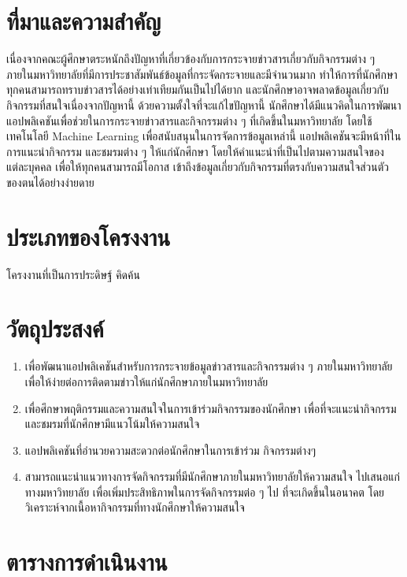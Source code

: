 \documentclass[14pt,oneside,openright,a4paper]{cpe-thai-project}
\begin{document}
\section{ที่มาและความสำคัญ}

เนื่องจากคณะผู้ศึกษาตระหนักถึงปัญหาที่เกี่ยวข้องกับการกระจายข่าวสารเกี่ยวกับกิจกรรมต่าง ๆ ภายในมหาวิทยาลัยที่มีการประชาสัมพันธ์ข้อมูลที่กระจัดกระจายและมีจำนวนมาก 
ทำให้การที่นักศึกษาทุกคนสามารถทราบข่าวสารได้อย่างเท่าเทียมกันเป็นไปได้ยาก และนักศึกษาอาจพลาดข้อมูลเกี่ยวกับกิจกรรมที่สนใจเนื่องจากปัญหานี้
ด้วยความตั้งใจที่จะแก้ไขปัญหานี้ นักศึกษาได้มีแนวคิดในการพัฒนา แอปพลิเคชันเพื่อช่วยในการกระจายข่าวสารและกิจกรรมต่าง ๆ ที่เกิดขึ้นในมหาวิทยาลัย 
โดยใช้เทคโนโลยี Machine Learning เพื่อสนับสนุนในการจัดการข้อมูลเหล่านี้ แอปพลิเคชันจะมีหน้าที่ในการแนะนำกิจกรรม และชมรมต่าง ๆ ให้แก่นักศึกษา 
โดยให้คำแนะนำที่เป็นไปตามความสนใจของแต่ละบุคคล เพื่อให้ทุกคนสามารถมีโอกาส เข้าถึงข้อมูลเกี่ยวกับกิจกรรมที่ตรงกับความสนใจส่วนตัวของตนได้อย่างง่ายดาย

\section{ประเภทของโครงงาน}

โครงงานที่เป็นการประดิษฐ์ คิดค้น

\section{วัตถุประสงค์}
  \begin{enumerate}
    \item เพื่อพัฒนาแอปพลิเคชันสำหรับการกระจายข้อมูลข่าวสารและกิจกรรมต่าง ๆ ภายในมหาวิทยาลัย เพื่อให้ง่ายต่อการติดตามข่าวให้แก่นักศึกษาภายในมหาวิทยาลัย 
    \item เพื่อศึกษาพฤติกรรมและความสนใจในการเข้าร่วมกิจกรรมของนักศึกษา เพื่อที่จะแนะนำกิจกรรมและชมรมที่นักศึกษามีแนวโน้มให้ความสนใจ
    \item แอปพลิเคชันที่อำนวยความสะดวกต่อนักศึกษาในการเข้าร่วม กิจกรรมต่างๆ 
    \item สามารถแนะนำแนวทางการจัดกิจกรรมที่มีนักศึกษาภายในมหาวิทยาลัยให้ความสนใจ ไปเสนอแก่ทางมหาวิทยาลัย เพื่อเพิ่มประสิทธิภาพในการจัดกิจกรรมต่อ ๆ ไป ที่จะเกิดขึ้นในอนาคต โดยวิเคราะห์จากเนื้อหากิจกรรมที่ทางนักศึกษาให้ความสนใจ
\end{enumerate}

\newpage

\section{ตารางการดำเนินงาน}
\end{document}
